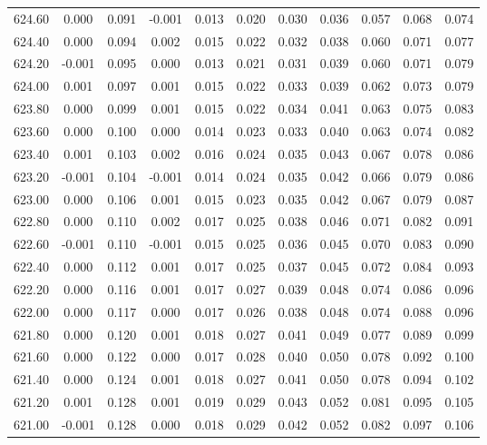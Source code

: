 \begin{longtable}{cccccccccc}
    624.60 &  0.000 &  0.091 & -0.001 &  0.013 &  0.020 &  0.030 &  0.036 &  0.057 &  0.068 &  0.074 \\
    624.40 &  0.000 &  0.094 &  0.002 &  0.015 &  0.022 &  0.032 &  0.038 &  0.060 &  0.071 &  0.077 \\
    624.20 & -0.001 &  0.095 &  0.000 &  0.013 &  0.021 &  0.031 &  0.039 &  0.060 &  0.071 &  0.079 \\
    624.00 &  0.001 &  0.097 &  0.001 &  0.015 &  0.022 &  0.033 &  0.039 &  0.062 &  0.073 &  0.079 \\
    623.80 &  0.000 &  0.099 &  0.001 &  0.015 &  0.022 &  0.034 &  0.041 &  0.063 &  0.075 &  0.083 \\
    623.60 &  0.000 &  0.100 &  0.000 &  0.014 &  0.023 &  0.033 &  0.040 &  0.063 &  0.074 &  0.082 \\
    623.40 &  0.001 &  0.103 &  0.002 &  0.016 &  0.024 &  0.035 &  0.043 &  0.067 &  0.078 &  0.086 \\
    623.20 & -0.001 &  0.104 & -0.001 &  0.014 &  0.024 &  0.035 &  0.042 &  0.066 &  0.079 &  0.086 \\
    623.00 &  0.000 &  0.106 &  0.001 &  0.015 &  0.023 &  0.035 &  0.042 &  0.067 &  0.079 &  0.087 \\
    622.80 &  0.000 &  0.110 &  0.002 &  0.017 &  0.025 &  0.038 &  0.046 &  0.071 &  0.082 &  0.091 \\
    622.60 & -0.001 &  0.110 & -0.001 &  0.015 &  0.025 &  0.036 &  0.045 &  0.070 &  0.083 &  0.090 \\
    622.40 &  0.000 &  0.112 &  0.001 &  0.017 &  0.025 &  0.037 &  0.045 &  0.072 &  0.084 &  0.093 \\
    622.20 &  0.000 &  0.116 &  0.001 &  0.017 &  0.027 &  0.039 &  0.048 &  0.074 &  0.086 &  0.096 \\
    622.00 &  0.000 &  0.117 &  0.000 &  0.017 &  0.026 &  0.038 &  0.048 &  0.074 &  0.088 &  0.096 \\
    621.80 &  0.000 &  0.120 &  0.001 &  0.018 &  0.027 &  0.041 &  0.049 &  0.077 &  0.089 &  0.099 \\
    621.60 &  0.000 &  0.122 &  0.000 &  0.017 &  0.028 &  0.040 &  0.050 &  0.078 &  0.092 &  0.100 \\
    621.40 &  0.000 &  0.124 &  0.001 &  0.018 &  0.027 &  0.041 &  0.050 &  0.078 &  0.094 &  0.102 \\
    621.20 &  0.001 &  0.128 &  0.001 &  0.019 &  0.029 &  0.043 &  0.052 &  0.081 &  0.095 &  0.105 \\
    621.00 & -0.001 &  0.128 &  0.000 &  0.018 &  0.029 &  0.042 &  0.052 &  0.082 &  0.097 &  0.106 \\

\end{longtable}
